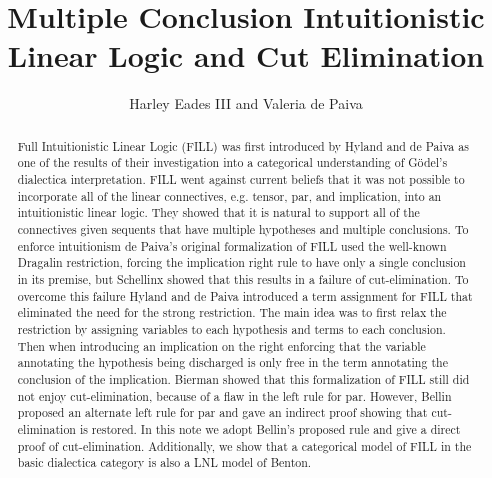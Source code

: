 \usepackage[utf8]{inputenc}
\usepackage{amssymb,amsmath,amsthm}
\usepackage{cmll}
\usepackage{stmaryrd}
\usepackage{todonotes}
\usepackage{mathpartir}
\usepackage{hyperref}
\usepackage[barr]{xy}
\usepackage{fullpage}


\title{Multiple Conclusion Intuitionistic Linear Logic and Cut Elimination}
\author{Harley Eades III and Valeria de Paiva}
\date{}

\usepackage{color}
\usepackage{supertabular}



\renewcommand{\FILLdrulename}[1]{\scriptsize \textsc{#1}}

\newcommand{\cat}[1]{\mathcal{#1}}
\newcommand{\limp}[0]{\multimap}
\newcommand{\dial}[0]{\mathsf{Dial_2}(\mathsf{Sets})}
\newcommand{\sets}[0]{\mathsf{Sets}}
\newcommand{\obj}[1]{\mathsf{Obj}(#1)}
\newcommand{\mor}[1]{\mathsf{Mor(#1)}}
\newcommand{\id}[0]{\mathsf{id}}
\newcommand{\lett}[0]{\mathsf{let}\,}
\newcommand{\inn}[0]{\,\mathsf{in}\,}



\maketitle

\begin{abstract}
  Full Intuitionistic Linear Logic (FILL) was first introduced by
  Hyland and de Paiva as one of the results of their investigation
  into a categorical understanding of G\"odel’s dialectica
  interpretation. FILL went against current beliefs that it was not
  possible to incorporate all of the linear connectives, e.g. tensor,
  par, and implication, into an intuitionistic linear logic. They
  showed that it is natural to support all of the connectives given
  sequents that have multiple hypotheses and multiple conclusions. To
  enforce intuitionism de Paiva’s original formalization of FILL used
  the well-known Dragalin restriction, forcing the implication right
  rule to have only a single conclusion in its premise, but Schellinx
  showed that this results in a failure of cut-elimination. To
  overcome this failure Hyland and de Paiva introduced a term
  assignment for FILL that eliminated the need for the strong
  restriction. The main idea was to first relax the restriction by
  assigning variables to each hypothesis and terms to each conclusion.
  Then when introducing an implication on the right enforcing that the
  variable annotating the hypothesis being discharged is only free in
  the term annotating the conclusion of the implication. Bierman
  showed that this formalization of FILL still did not enjoy
  cut-elimination, because of a flaw in the left rule for
  par. However, Bellin proposed an alternate left rule for par and
  gave an indirect proof showing that cut-elimination is restored. In
  this note we adopt Bellin’s proposed rule and give a direct proof of
  cut-elimination.  Additionally, we show that a categorical model of
  FILL in the basic dialectica category is also a LNL model of Benton.
\end{abstract}

